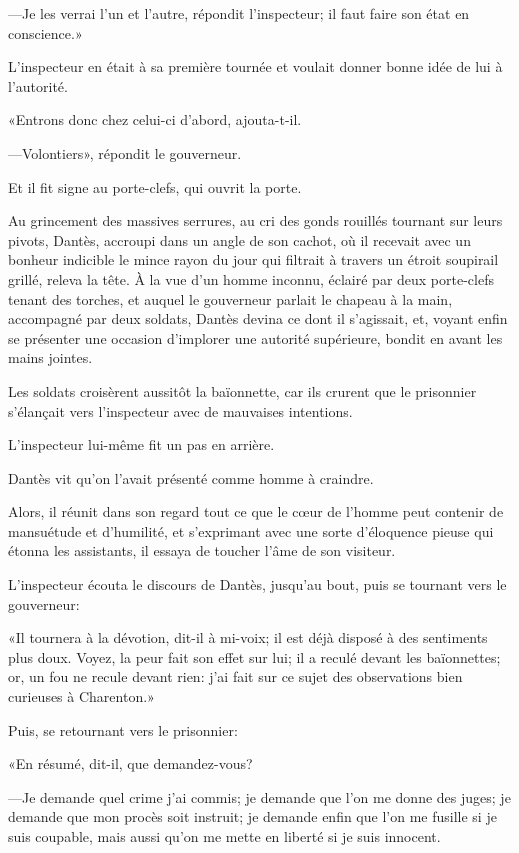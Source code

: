 —Je les verrai l'un et l'autre, répondit l'inspecteur; il faut faire son état en conscience.»

L'inspecteur en était à sa première tournée et voulait donner bonne idée de lui à l'autorité.

«Entrons donc chez celui-ci d'abord, ajouta-t-il.

—Volontiers», répondit le gouverneur.

Et il fit signe au porte-clefs, qui ouvrit la porte.

Au grincement des massives serrures, au cri des gonds rouillés tournant sur leurs pivots, Dantès, accroupi dans un angle de son cachot, où il recevait avec un bonheur indicible le mince rayon du jour qui filtrait à travers un étroit soupirail grillé, releva la tête. À la vue d'un homme inconnu, éclairé par deux porte-clefs tenant des torches, et auquel le gouverneur parlait le chapeau à la main, accompagné par deux soldats, Dantès devina ce dont il s'agissait, et, voyant enfin se présenter une occasion d'implorer une autorité supérieure, bondit en avant les mains jointes.

Les soldats croisèrent aussitôt la baïonnette, car ils crurent que le prisonnier s'élançait vers l'inspecteur avec de mauvaises intentions.

L'inspecteur lui-même fit un pas en arrière.

Dantès vit qu'on l'avait présenté comme homme à craindre.

Alors, il réunit dans son regard tout ce que le cœur de l'homme peut contenir de mansuétude et d'humilité, et s'exprimant avec une sorte d'éloquence pieuse qui étonna les assistants, il essaya de toucher l'âme de son visiteur.

L'inspecteur écouta le discours de Dantès, jusqu'au bout, puis se tournant vers le gouverneur:

«Il tournera à la dévotion, dit-il à mi-voix; il est déjà disposé à des sentiments plus doux. Voyez, la peur fait son effet sur lui; il a reculé devant les baïonnettes; or, un fou ne recule devant rien: j'ai fait sur ce sujet des observations bien curieuses à Charenton.»

Puis, se retournant vers le prisonnier:

«En résumé, dit-il, que demandez-vous?

—Je demande quel crime j'ai commis; je demande que l'on me donne des juges; je demande que mon procès soit instruit; je demande enfin que l'on me fusille si je suis coupable, mais aussi qu'on me mette en liberté si je suis innocent.

